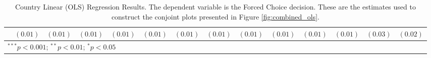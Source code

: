 \begin{sidewaystable}
\begin{center}
\begin{scriptsize}
\begin{tabular}{l c c c c c c c c c c c c c}
                                                & $(0.01)$      & $(0.01)$      & $(0.01)$      & $(0.01)$      & $(0.01)$     & $(0.01)$      & $(0.01)$      & $(0.01)$     & $(0.01)$      & $(0.01)$      & $(0.01)$      & $(0.03)$      & $(0.02)$      \\
\hline
\multicolumn{14}{l}{\tiny{$^{***}p<0.001$; $^{**}p<0.01$; $^{*}p<0.05$}}
\end{tabular}
\end{scriptsize}
\caption{Country Linear (OLS) Regression Results. The dependent variable is the Forced Choice decision. These are the estimates used to construct the conjoint plots presented in Figure \ref{fig:combined_ols}.}
\label{table:ols1}
\end{center}
\end{sidewaystable}
